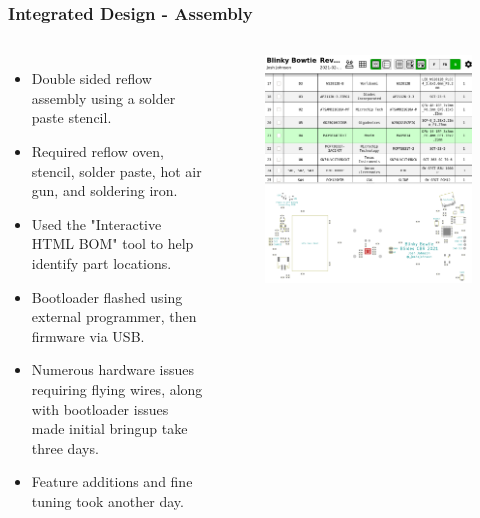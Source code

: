 \documentclass[aspectratio=169, t]{beamer}
\begin{document}
\begin{frame}
\frametitle{Integrated Design - Assembly}
\vspace{-5mm}
\begin{columns}
	\begin{itemize}
		\item Double sided reflow assembly using a solder paste stencil.
		\item Required reflow oven, stencil, solder paste, hot air gun, and soldering iron.
		\item Used the "Interactive HTML BOM" tool to help identify part locations.
		\item Bootloader flashed using external programmer, then firmware via USB.
		\item Numerous hardware issues requiring flying wires, along with bootloader issues made initial bringup take three days.
		\item Feature additions and fine tuning took another day.
	\end{itemize}
	\begin{figure}
		\includegraphics[width=0.85\linewidth]{images/ibom.png}
	\end{figure}
\end{columns}
\end{frame}
\end{document}
